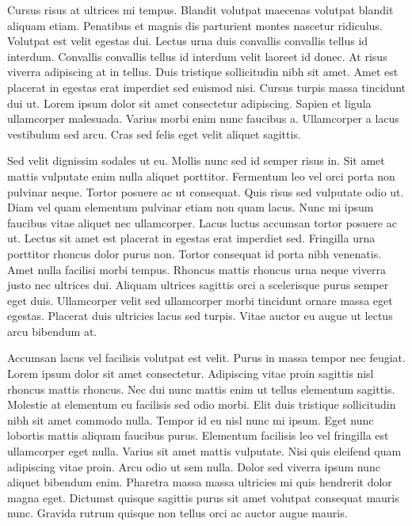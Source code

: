 \documentclass[11pt,a4paper]{article}
\begin{document}
Cursus risus at ultrices mi tempus. Blandit volutpat maecenas volutpat blandit aliquam etiam. Penatibus et magnis dis parturient montes nascetur ridiculus. Volutpat est velit egestas dui. Lectus urna duis convallis convallis tellus id interdum. Convallis convallis tellus id interdum velit laoreet id donec. At risus viverra adipiscing at in tellus. Duis tristique sollicitudin nibh sit amet. Amet est placerat in egestas erat imperdiet sed euismod nisi. Cursus turpis massa tincidunt dui ut. Lorem ipsum dolor sit amet consectetur adipiscing. Sapien et ligula ullamcorper malesuada. Varius morbi enim nunc faucibus a. Ullamcorper a lacus vestibulum sed arcu. Cras sed felis eget velit aliquet sagittis.

Sed velit dignissim sodales ut eu. Mollis nunc sed id semper risus in. Sit amet mattis vulputate enim nulla aliquet porttitor. Fermentum leo vel orci porta non pulvinar neque. Tortor posuere ac ut consequat. Quis risus sed vulputate odio ut. Diam vel quam elementum pulvinar etiam non quam lacus. Nunc mi ipsum faucibus vitae aliquet nec ullamcorper. Lacus luctus accumsan tortor posuere ac ut. Lectus sit amet est placerat in egestas erat imperdiet sed. Fringilla urna porttitor rhoncus dolor purus non. Tortor consequat id porta nibh venenatis. Amet nulla facilisi morbi tempus. Rhoncus mattis rhoncus urna neque viverra justo nec ultrices dui. Aliquam ultrices sagittis orci a scelerisque purus semper eget duis. Ullamcorper velit sed ullamcorper morbi tincidunt ornare massa eget egestas. Placerat duis ultricies lacus sed turpis. Vitae auctor eu augue ut lectus arcu bibendum at.

Accumsan lacus vel facilisis volutpat est velit. Purus in massa tempor nec feugiat. Lorem ipsum dolor sit amet consectetur. Adipiscing vitae proin sagittis nisl rhoncus mattis rhoncus. Nec dui nunc mattis enim ut tellus elementum sagittis. Molestie at elementum eu facilisis sed odio morbi. Elit duis tristique sollicitudin nibh sit amet commodo nulla. Tempor id eu nisl nunc mi ipsum. Eget nunc lobortis mattis aliquam faucibus purus. Elementum facilisis leo vel fringilla est ullamcorper eget nulla. Varius sit amet mattis vulputate. Nisi quis eleifend quam adipiscing vitae proin. Arcu odio ut sem nulla. Dolor sed viverra ipsum nunc aliquet bibendum enim. Pharetra massa massa ultricies mi quis hendrerit dolor magna eget. Dictumst quisque sagittis purus sit amet volutpat consequat mauris nunc. Gravida rutrum quisque non tellus orci ac auctor augue mauris.
\end{document}
